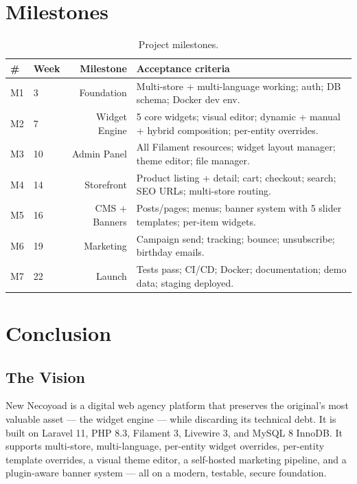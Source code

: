 \documentclass[11pt,a4paper]{article}
\begin{document}
\section{Milestones}\label{sec:milestones}

\begin{table}[htbp]
\centering
\caption{Project milestones.}\label{tab:milestones}
\footnotesize\sloppy
\begin{tabularx}{\columnwidth}{>{\raggedright\arraybackslash}p{1.0cm}lrX}
\toprule
\# & \textbf{Week} & \textbf{Milestone} & \textbf{Acceptance criteria} \\
\midrule
M1 & 3 & Foundation & Multi-store + multi-language working; auth; DB schema; Docker dev env. \\
M2 & 7 & Widget Engine & 5 core widgets; visual editor; dynamic + manual + hybrid composition; per-entity overrides. \\
M3 & 10 & Admin Panel & All Filament resources; widget layout manager; theme editor; file manager. \\
M4 & 14 & Storefront & Product listing + detail; cart; checkout; search; SEO URLs; multi-store routing. \\
M5 & 16 & CMS + Banners & Posts/pages; menus; banner system with 5 slider templates; per-item widgets. \\
M6 & 19 & Marketing & Campaign send; tracking; bounce; unsubscribe; birthday emails. \\
M7 & 22 & Launch & Tests pass; CI/CD; Docker; documentation; demo data; staging deployed. \\
\bottomrule
\end{tabularx}
\end{table}

\section{Conclusion}\label{sec:conclusion}

\subsection{The Vision}

New Necoyoad is a digital web agency platform that preserves the
original's most valuable asset --- the widget engine --- while
discarding its technical debt. It is built on Laravel 11, PHP 8.3,
Filament 3, Livewire 3, and MySQL 8 InnoDB. It supports multi-store,
multi-language, per-entity widget overrides, per-entity template
overrides, a visual theme editor, a self-hosted marketing pipeline,
and a plugin-aware banner system --- all on a modern, testable,
secure foundation.
\end{document}
